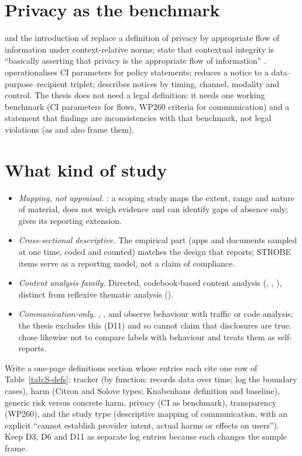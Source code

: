 \section{Privacy as the benchmark}
 and the introduction of  replace a definition of privacy by appropriate flow of information under context-relative norms;  state that contextual integrity is ``basically asserting that privacy is the appropriate flow of information'' .  operationalises CI parameters for policy statements;  reduces a notice to a data--purpose--recipient triplet;  describes notices by timing, channel, modality and control. The thesis does not need a legal definition: it needs one working benchmark (CI parameters for flows, WP260 criteria for communication) and a statement that findings are inconsistencies with that benchmark, not legal violations (as  and  also frame them).

\section{What kind of study}
\begin{itemize}
\item \emph{Mapping, not appraisal.} : a scoping study maps the extent, range and nature of material, does not weigh evidence and can identify gaps of absence only;  gives its reporting extension.
\item \emph{Cross-sectional descriptive.} The empirical part (apps and documents sampled at one time, coded and counted) matches the design that  reports; STROBE items serve as a reporting model, not a claim of compliance.
\item \emph{Content analysis family.} Directed, codebook-based content analysis (, , ), distinct from reflexive thematic analysis ().
\item \emph{Communication-only.} , ,  and  observe behaviour with traffic or code analysis; the thesis excludes this (D11) and so cannot claim that disclosures are true.  chose likewise not to compare labels with behaviour and treats them as self-reports.
\end{itemize}

\begin{thesisbox}
Write a one-page definitions section whose entries each cite one row of Table~\ref{tab:S-defs}: tracker (by function: records data over time; log the boundary cases), harm (Citron and Solove types; Knabenhans definition and baseline), generic risk versus concrete harm, privacy (CI as benchmark), transparency (WP260), and the study type (descriptive mapping of communication, with an explicit ``cannot establish provider intent, actual harms or effects on users''). Keep D3, D6 and D11 as separate log entries because each changes the sample frame.
\end{thesisbox}
